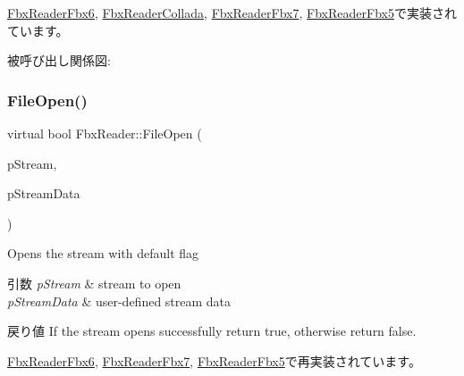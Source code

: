 \hyperlink{class_fbx_reader_fbx6_aae8a88d85353be67413ce60a27873422}{Fbx\+Reader\+Fbx6}, \hyperlink{class_fbx_reader_collada_aec7a5267f85187eeb26dd55ec250119e}{Fbx\+Reader\+Collada}, \hyperlink{class_fbx_reader_fbx7_a06899ecd549ba92789673586d05825cb}{Fbx\+Reader\+Fbx7}, \hyperlink{class_fbx_reader_fbx5_a1aef8cc95eae3b44812beef48d6edb5d}{Fbx\+Reader\+Fbx5}で実装されています。

被呼び出し関係図\+:
\mbox{\label{class_fbx_reader_a819487a39b5e25f69a8dccf187ab4ab9}} 
\subsubsection{\texorpdfstring{File\+Open()}{FileOpen()}\hspace{0.1cm}{\footnotesize\ttfamily [2/4]}}
{\footnotesize\ttfamily virtual bool Fbx\+Reader\+::\+File\+Open (\begin{DoxyParamCaption}\item[{\hyperlink{class_fbx_stream}{Fbx\+Stream} $\ast$}]{p\+Stream,  }\item[{void $\ast$}]{p\+Stream\+Data }\end{DoxyParamCaption})\hspace{0.3cm}{\ttfamily [virtual]}}

Opens the stream with default flag 
\begin{DoxyParams}{引数}
{\em p\+Stream} & stream to open \\
\hline
{\em p\+Stream\+Data} & user-\/defined stream data \\
\hline
\end{DoxyParams}
\begin{DoxyReturn}{戻り値}
If the stream opens successfully return {\ttfamily true}, otherwise return {\ttfamily false}. 
\end{DoxyReturn}


\hyperlink{class_fbx_reader_fbx6_a841f736cd6203c124aba426b66559968}{Fbx\+Reader\+Fbx6}, \hyperlink{class_fbx_reader_fbx7_a3ae495d359793c9389f02a1ed1e435ff}{Fbx\+Reader\+Fbx7}, \hyperlink{class_fbx_reader_fbx5_a1ac1c0598fea61e91ac2c98de15a0d24}{Fbx\+Reader\+Fbx5}で再実装されています。

\mbox{\label{class_fbx_reader_a345b292805ea8799a9d962714e1ad9a5}} 
